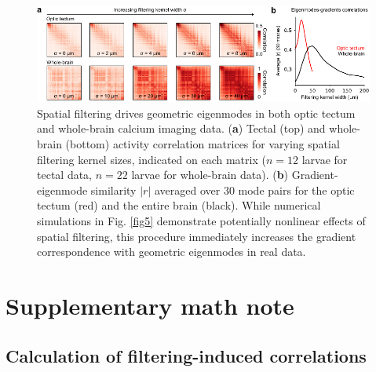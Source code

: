 \documentclass{article}
\begin{document}
\begin{figure}[t]
    \centering
    \includegraphics[width=1.0\linewidth]{figures/supp_smoothing.pdf}
    \caption{Spatial filtering drives geometric eigenmodes in both optic tectum and whole-brain calcium imaging data. (\textbf{a}) Tectal (top) and whole-brain (bottom) activity correlation matrices for varying spatial filtering kernel sizes, indicated on each matrix ($n=12$ larvae for tectal data, $n=22$ larvae for whole-brain data). (\textbf{b}) Gradient-eigenmode similarity $|r|$ averaged over 30 mode pairs for the optic tectum (red) and the entire brain (black). While numerical simulations in Fig. \ref{fig5} demonstrate potentially nonlinear effects of spatial filtering, this procedure immediately increases the gradient correspondence with geometric eigenmodes in real data.}
    \label{supp_smoothing}
\end{figure}

\newpage
\clearpage

\section*{Supplementary math note}

\subsection*{Calculation of filtering-induced correlations}
\end{document}

